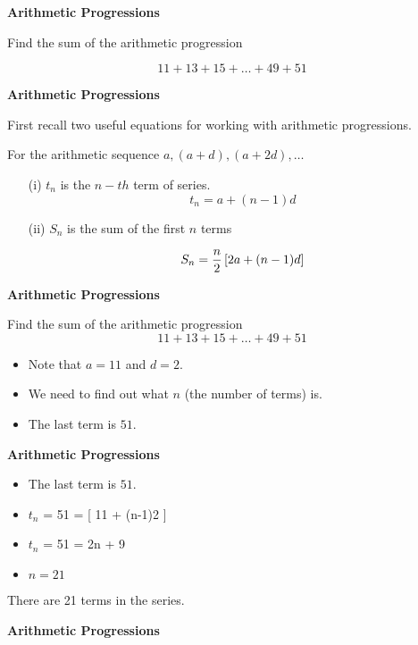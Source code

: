 
\noindent\textbf{Arithmetic Progressions}

Find the sum of the arithmetic progression
{

\[ 11 + 13 + 15 + \ldots + 49 + 51 \]
}




\noindent\textbf{Arithmetic Progressions}

First recall two useful equations for working with arithmetic progressions.\\
\bigskip


For the arithmetic sequence $a,(a+d) ,(a+2d), \ldots$

\begin{itemize}
\item[(i)] $t_n$ is the $n-th$ term of series.\[ t_n= a+(n-1)d \]

\item[(ii)] $S_n$ is the sum of the first $n$ terms

\[ S_n  = {n \over 2} \left[ 2a+(n-1)d \right] \]
\end{itemize}




\noindent\textbf{Arithmetic Progressions}

Find the sum of the arithmetic progression
{
\[ 11 + 13 + 15 + \dots + 49 + 51 \]
}
\begin{itemize}
\item Note that $a=11$ and $d=2$.
\item We need to find out what $n$ (the number of terms) is.
\item The last term is $51$.
\end{itemize}




\noindent\textbf{Arithmetic Progressions}

\begin{itemize}
\item The last term is $51$.
\item $t_n$ = 51 = [ 11 + (n-1)2 ] 
\item $t_n$ = 51 = 2n + 9
\item $n=21$
\end{itemize}
There are 21 terms in the series.




\noindent\textbf{Arithmetic Progressions}


